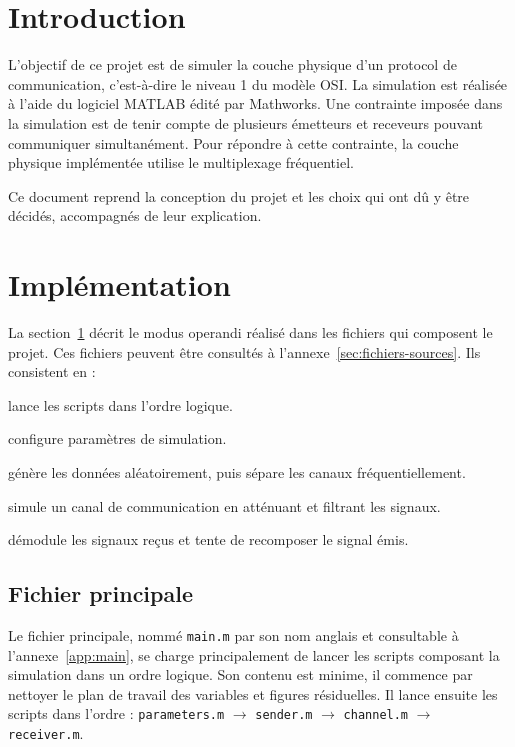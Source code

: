 \documentclass[10pt, oneside, a4paper]{article}
\begin{document}
\tableofcontents
\newpage

\section*{Introduction}
L'objectif de ce projet est de simuler la couche physique d'un protocol de communication, c'est-à-dire le niveau 1 du modèle OSI.
La simulation est réalisée à l'aide du logiciel MATLAB\textregistered{} édité par Mathworks\textregistered{}.
Une contrainte imposée dans la simulation est de tenir compte de plusieurs émetteurs et receveurs pouvant communiquer simultanément.
Pour répondre à cette contrainte, la couche physique implémentée utilise le multiplexage fréquentiel.

Ce document reprend la conception du projet et les choix qui ont dû y être décidés, accompagnés de leur explication.


\section{Implémentation}
\label{sec:implementation}
La section~\ref{sec:implementation} décrit le modus operandi réalisé dans les fichiers qui composent le projet.
Ces fichiers peuvent être consultés à l'annexe~\ref{sec:fichiers-sources}.
Ils consistent en :
\begin{description}[align=right,labelwidth=2cm,labelindent=1cm]
    \item[main.m] lance les scripts dans l'ordre logique.
    \item[parameters.m] configure paramètres de simulation.
    \item[sender.m] génère les données aléatoirement, puis sépare les canaux
        fréquentiellement.
    \item[channel.m] simule un canal de communication en atténuant et filtrant les signaux.
    \item[receiver.m] démodule les signaux reçus et tente de recomposer le signal émis.
\end{description}

\subsection{Fichier principale}
Le fichier principale, nommé \texttt{main.m} par son nom anglais et consultable à l'annexe~\ref{app:main}, se charge principalement de lancer les scripts composant la simulation dans un ordre logique.
Son contenu est minime, il commence par nettoyer le plan de travail des variables et figures résiduelles.
Il lance ensuite les scripts dans l'ordre : \texttt{parameters.m} $\rightarrow$ \texttt{sender.m} $\rightarrow$ \texttt{channel.m} $\rightarrow$ \texttt{receiver.m}.
\end{document}
